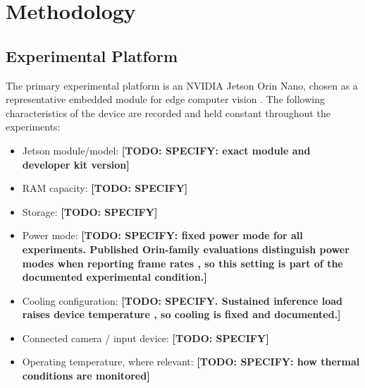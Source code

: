%

\providecommand{\todo}[1]{\textbf{[TODO: #1]}}

\chapter{Methodology}
\label{chap:methodology}

\section{Experimental Platform}
\label{sec:platform}

The primary experimental platform is an NVIDIA Jetson Orin Nano, chosen
as a representative embedded module for edge computer vision
\cite{scalcon2024, alqahtani2026}. The following characteristics of the
device are recorded and held constant throughout the experiments:

\begin{itemize}
  \item Jetson module/model: \todo{SPECIFY: exact module and developer kit
        version}
  \item RAM capacity: \todo{SPECIFY}
  \item Storage: \todo{SPECIFY}
  \item Power mode: \todo{SPECIFY: fixed power mode for all experiments.
        Published Orin-family evaluations distinguish power modes when
        reporting frame rates \cite{scalcon2024}, so this setting is part
        of the documented experimental condition.}
  \item Cooling configuration: \todo{SPECIFY. Sustained inference load
        raises device temperature \cite{zequn2026}, so cooling is fixed
        and documented.}
  \item Connected camera / input device: \todo{SPECIFY}
  \item Operating temperature, where relevant: \todo{SPECIFY: how thermal
        conditions are monitored}
\end{itemize}


